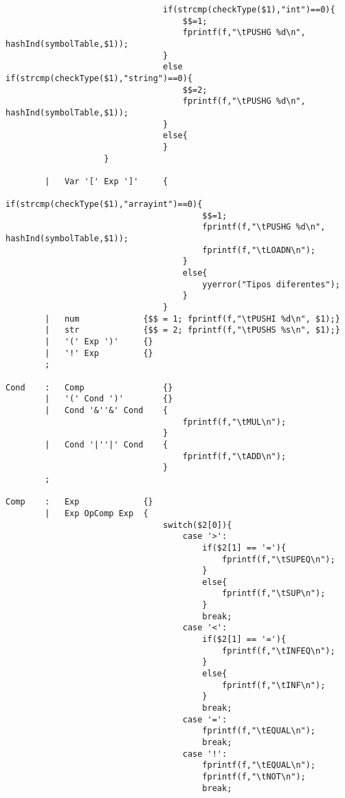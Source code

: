 \documentclass{report}
\begin{document}
\begin{verbatim}
                                if(strcmp(checkType($1),"int")==0){
                                    $$=1;
                                    fprintf(f,"\tPUSHG %d\n", hashInd(symbolTable,$1));
                                }
                                else if(strcmp(checkType($1),"string")==0){
                                    $$=2;
                                    fprintf(f,"\tPUSHG %d\n", hashInd(symbolTable,$1));
                                }
                                else{
                                }
                    }

        |   Var '[' Exp ']'     {
                                    if(strcmp(checkType($1),"arrayint")==0){
                                        $$=1;
                                        fprintf(f,"\tPUSHG %d\n", hashInd(symbolTable,$1));
                                        fprintf(f,"\tLOADN\n");
                                    }
                                    else{
                                        yyerror("Tipos diferentes");
                                    }
                                }
        |   num             {$$ = 1; fprintf(f,"\tPUSHI %d\n", $1);}
        |   str             {$$ = 2; fprintf(f,"\tPUSHS %s\n", $1);}
        |   '(' Exp ')'     {}
        |   '!' Exp         {}
        ;

Cond    :   Comp                {}
        |   '(' Cond ')'        {}
        |   Cond '&''&' Cond    {
                                    fprintf(f,"\tMUL\n");
                                }
        |   Cond '|''|' Cond    {
                                    fprintf(f,"\tADD\n");
                                }
        ;

Comp    :   Exp             {}
        |   Exp OpComp Exp  {
                                switch($2[0]){
                                    case '>':
                                        if($2[1] == '='){
                                            fprintf(f,"\tSUPEQ\n");
                                        }
                                        else{
                                            fprintf(f,"\tSUP\n");
                                        }
                                        break;
                                    case '<':
                                        if($2[1] == '='){
                                            fprintf(f,"\tINFEQ\n");
                                        }
                                        else{
                                            fprintf(f,"\tINF\n");
                                        }
                                        break;
                                    case '=':
                                        fprintf(f,"\tEQUAL\n");
                                        break;
                                    case '!':
                                        fprintf(f,"\tEQUAL\n");
                                        fprintf(f,"\tNOT\n");
                                        break;


\end{verbatim}
\end{document}
